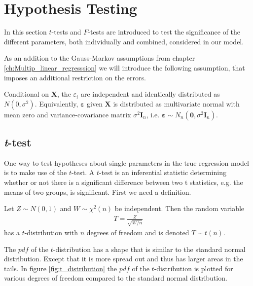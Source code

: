 \section{Hypothesis Testing}\label{sec:Hypothesis_Testing}
In this section $t$-tests and $F$-tests are introduced to test the significance of the different parameters, both individually and combined, considered in our model. 

As an addition to the Gauss-Markov assumptions from chapter \ref{ch:Multip_linear_regresssion} we will introduce the following assumption, that imposes an additional restriction on the errors. 
\begin{assumption} \label{as:normality_of_errors}
    Conditional on $\mathbf{X}$, the $\varepsilon_i$ are independent and identically distributed as $N(0, \sigma^2)$. Equivalently, $\boldsymbol{\varepsilon}$ given $\mathbf{X}$ is distributed as multivariate normal with mean zero and variance-covariance matrix $\sigma^2 \mathbf{I}_{n}$, i.e. $\boldsymbol{\varepsilon} \sim N_n(\mathbf{0}, \sigma^2 \mathbf{I}_{n})$.
\end{assumption}

\subsection{\textit{t}-test}
One way to test hypotheses about single parameters in the true regression model is to make use of the $t$-test. 
A $t$-test is an inferential statistic determining whether or not there is a significant difference between two t statistics, e.g.$\!$ the means of two groups, is significant. First we need a definition.

\begin{definition}\label{def:t_distribution}
    Let $Z \sim N(0,1)$ and $W \sim \chi^2(n)$ be independent. Then the random variable
    \begin{align*}
       T = \frac{Z}{\sqrt{W/n}}
    \end{align*}
    has a $t$-distribution with $n$ degrees of freedom and is denoted $T \sim t(n)$.
\end{definition}

The $pdf$ of the $t$-distribution has a shape that is similar to the standard normal distribution. 
Except that it is more spread out and thus has larger areas in the tails. 
In figure \ref{fig:t_distribution} the $pdf$ of the $t$-distribution is plotted for various degrees of freedom compared to the standard normal distribution. 

